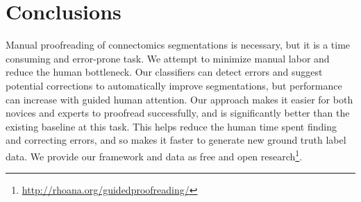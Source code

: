 \section{Conclusions}


Manual proofreading of connectomics segmentations is necessary, but it is a time consuming and error-prone task. We attempt to minimize manual labor and reduce the human bottleneck. Our classifiers can detect errors and suggest potential corrections to automatically improve segmentations, but performance can increase with guided human attention. Our approach makes it easier for both novices and experts to proofread successfully, and is significantly better than the existing baseline at this task. This helps reduce the human time spent finding and correcting errors, and so makes it faster to generate new ground truth label data. We provide our framework and data as free and open research\footnote{\scriptsize{\url{http://rhoana.org/guidedproofreading/}}}.

